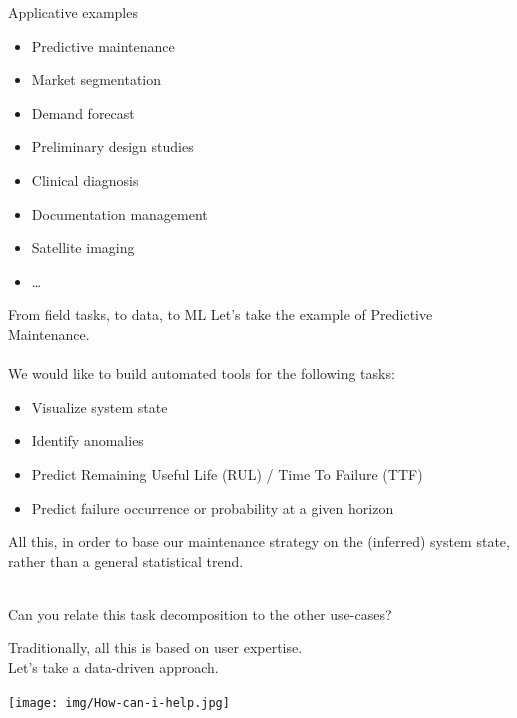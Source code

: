 \documentclass[10pt,a4paper,t,aspectratio=1610,dvipsnames]{beamer}
\begin{document}
\begin{frame}{Applicative examples}
\begin{itemize}
		\item Predictive maintenance%
		\item Market segmentation%
		\item Demand forecast
		\item Preliminary design studies
		\item Clinical diagnosis
		\item Documentation management
		\item Satellite imaging
		\item \ldots
\end{itemize}
\end{frame}

\begin{frame}{From field tasks, to data, to ML}
	Let's take the example of Predictive Maintenance.\\
	~\\
	We would like to build automated tools for the following tasks:
	\begin{itemize}
		\item Visualize system state
		\item Identify anomalies
		\item Predict Remaining Useful Life (RUL) / Time To Failure (TTF)
		\item Predict failure occurrence or probability at a given horizon
	\end{itemize}
	All this, in order to base our maintenance strategy on the (inferred) system state, rather than a general statistical trend.\\
	~\\
	\begin{block}{}
		Can you relate this task decomposition to the other use-cases?
	\end{block}
	
	\begin{minipage}{.5\textwidth}
		Traditionally, all this is based on user expertise.\\
		Let's take a data-driven approach.
	\end{minipage}
	\begin{minipage}{.45\textwidth}
		\hfill \texttt{[image: img/How-can-i-help.jpg]}
	\end{minipage}
\end{frame}
\end{document}
